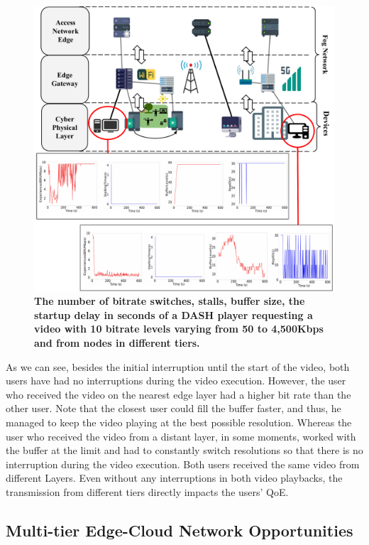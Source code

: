 \begin{figure}
    \centering
    \includegraphics[width=0.9\linewidth]{images/qoe-multi-level.pdf}
    \caption{\textbf{The number of bitrate switches, stalls, buffer size, the startup delay in seconds of a DASH player requesting a video with 10 bitrate levels varying from 50 to 4,500Kbps and from nodes in different tiers.}}
    \label{fig:impact-two-layers}
\end{figure}


As we can see, besides the initial interruption until the start of the video, both users have had no interruptions during the video execution. However, the user who received the video on the nearest edge layer had a higher bit rate than the other user. 
Note that the closest user could fill the buffer faster, and thus, he managed to keep the video playing at the best possible resolution.
Whereas the user who received the video from a distant layer, in some moments, worked with the buffer at the limit and had to constantly switch resolutions so that there is no interruption during the video execution. 
Both users received the same video from different Layers. Even without any interruptions in both video playbacks, the transmission from different tiers directly impacts the users' QoE.


\subsection{Multi-tier Edge-Cloud Network Opportunities}

